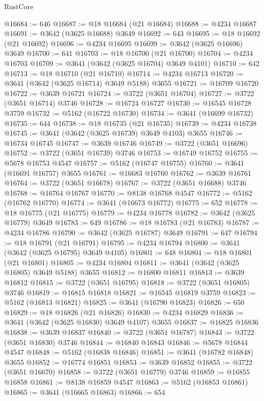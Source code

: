 \begin{lexlean}{RustCore}
\begin{coremodule}
@16684 := 646
@16687 := @18 @16684 (@21 @16684)
@16688 := @4234 @16687
@16691 := @3642 (@3625 @16688) @3649
@16692 := 643
@16695 := @18 @16692 (@21 @16692)
@16696 := @4234 @16695
@16699 := @3642 (@3625 @16696) @3649
@16700 := 641
@16703 := @18 @16700 (@21 @16700)
@16704 := @4234 @16703
@16709 := @3641 (@3642 (@3625 @16704) @3649 @4101)
@16710 := 642
@16713 := @18 @16710 (@21 @16710)
@16714 := @4234 @16713
@16720 := @3641 (@3642 (@3625 @16714) @3649 @5188) @3655
@16721 := @16709 @16720
@16722 := @3639 @16721
@16724 := @3722 (@3651 @16704)
@16727 := @3722 (@3651 @16714) @3746
@16728 := @16724 @16727
@16730 := @16545 @16728 @3759
@16732 := @5162 (@16722 @16730)
@16734 := @3641 (@16699 @16732)
@16735 := 644
@16738 := @18 @16735 (@21 @16735)
@16739 := @4234 @16738
@16745 := @3641 (@3642 (@3625 @16739) @3649 @4103) @3655
@16746 := @16734 @16745
@16747 := @3639 @16746
@16749 := @3722 (@3651 @16696)
@16752 := @3722 (@3651 @16739) @3746
@16753 := @16749 @16752
@16755 := @5678 @16753 @4547
@16757 := @5162 (@16747 @16755)
@16760 := @3641 (@16691 @16757) @3655
@16761 := @16683 @16760
@16762 := @3639 @16761
@16764 := @3722 (@3651 @16678)
@16767 := @3722 (@3651 @16688) @3746
@16768 := @16764 @16767
@16770 := @8138 @16768 @4547
@16772 := @5162 (@16762 @16770)
@16774 := @3641 (@16673 @16772)
@16775 := 652
@16778 := @18 @16775 (@21 @16775)
@16779 := @4234 @16778
@16782 := @3642 (@3625 @16779) @3649
@16783 := 649
@16786 := @18 @16783 (@21 @16783)
@16787 := @4234 @16786
@16790 := @3642 (@3625 @16787) @3649
@16791 := 647
@16794 := @18 @16791 (@21 @16791)
@16795 := @4234 @16794
@16800 := @3641 (@3642 (@3625 @16795) @3649 @4105)
@16801 := 648
@16804 := @18 @16801 (@21 @16801)
@16805 := @4234 @16804
@16811 := @3641 (@3642 (@3625 @16805) @3649 @5188) @3655
@16812 := @16800 @16811
@16813 := @3639 @16812
@16815 := @3722 (@3651 @16795)
@16818 := @3722 (@3651 @16805) @3746
@16819 := @16815 @16818
@16821 := @16545 @16819 @3759
@16823 := @5162 (@16813 @16821)
@16825 := @3641 (@16790 @16823)
@16826 := 650
@16829 := @18 @16826 (@21 @16826)
@16830 := @4234 @16829
@16836 := @3641 (@3642 (@3625 @16830) @3649 @4107) @3655
@16837 := @16825 @16836
@16838 := @3639 @16837
@16840 := @3722 (@3651 @16787)
@16843 := @3722 (@3651 @16830) @3746
@16844 := @16840 @16843
@16846 := @5678 @16844 @4547
@16848 := @5162 (@16838 @16846)
@16851 := @3641 (@16782 @16848) @3655
@16852 := @16774 @16851
@16853 := @3639 @16852
@16855 := @3722 (@3651 @16670)
@16858 := @3722 (@3651 @16779) @3746
@16859 := @16855 @16858
@16861 := @8138 @16859 @4547
@16863 := @5162 (@16853 @16861)
@16865 := @3641 (@16665 @16863)
@16866 := 654

\end{coremodule}
\end{lexlean}
